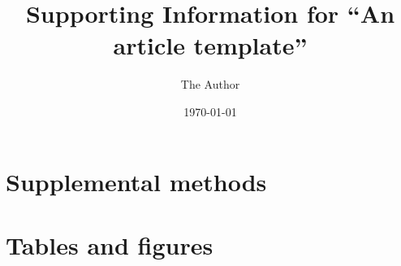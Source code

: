 \documentclass[]{article}
\begin{document}
\title{Supporting Information for ``An article template''}
\author[1,*]{The Author}
\date{\today}
\maketitle

\renewcommand{\thefigure}{S\arabic{figure}}
\renewcommand{\thetable}{S\arabic{table}}
\renewcommand{\theequation}{S\arabic{equation}}
\setcounter{figure}{0}
\setcounter{table}{0}
\setcounter{equation}{0}

\section{Supplemental methods}




\clearpage

\section{Tables and figures}
\end{document}
